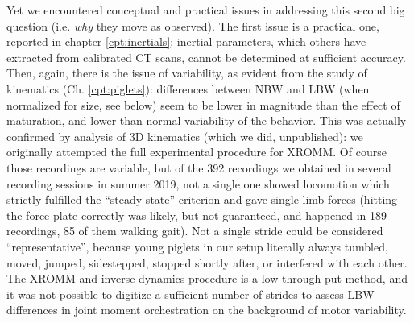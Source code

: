 Yet we encountered conceptual and practical issues in addressing this second big question (i.e. \emph{why} they move as observed).
The first issue is a practical one, reported in chapter \ref{cpt:inertials}: inertial parameters, which others have extracted from calibrated CT scans, cannot be determined at sufficient accuracy.
Then, again, there is the issue of variability, as evident from the study of kinematics (Ch. \ref{cpt:piglets}):
differences between NBW and LBW (when normalized for size, see below) seem to be lower in magnitude than the effect of maturation, and lower than normal variability of the behavior.
This was actually confirmed by analysis of 3D kinematics (which we did, unpublished): we originally attempted the full experimental procedure for XROMM.
Of course those recordings are variable, but of the 392 recordings we obtained in several recording sessions in summer 2019, not a single one showed locomotion which strictly fulfilled the ``steady state'' criterion and gave single limb forces (hitting the force plate correctly was likely, but not guaranteed, and happened in 189 recordings, 85 of them walking gait).
Not a single stride could be considered ``representative'', because young piglets in our setup literally always tumbled, moved, jumped, sidestepped, stopped shortly after, or interfered with each other.
The XROMM and inverse dynamics procedure is a low through-put method, and it was not possible to digitize a sufficient number of strides to assess LBW differences in joint moment orchestration on the background of motor variability.


